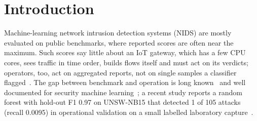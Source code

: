 \section{Introduction}\label{sec:intro}

Machine-learning network intrusion detection systems (NIDS) are mostly evaluated on public benchmarks, where reported scores are often near the maximum. Such scores say little about an IoT gateway, which has a few CPU cores, sees traffic in time order, builds flows itself and must act on its verdicts; operators, too, act on aggregated reports, not on single samples a classifier flagged~\cite{apruzzese2026reshaping}. The gap between benchmark and operation is long known~\cite{sommer2010outside} and well documented for security machine learning~\cite{arp2022dos,apruzzese2023sok}; a recent study reports a random forest with hold-out F1 0.97 on UNSW-NB15 that detected 1 of 105 attacks (recall 0.0095) in operational validation on a small labelled laboratory capture~\cite{tang2026hybrid}.


